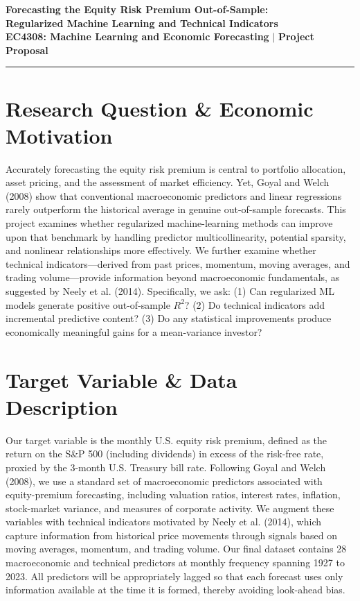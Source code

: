 \documentclass[10pt,a4paper]{article}
\begin{document}
\begin{center}
    {\Large \textbf{Forecasting the Equity Risk Premium Out-of-Sample:}}\\[2pt]
    {\large \textbf{Regularized Machine Learning and Technical Indicators}}\\[5pt]
    {\normalsize \textbf{EC4308: Machine Learning and Economic Forecasting} \quad $\vert$ \quad \textbf{Project Proposal}}
\end{center}

\vspace{-4pt}
\noindent\rule{\textwidth}{0.6pt}
\vspace{-2pt}

\section{Research Question \& Economic Motivation}
Accurately forecasting the equity risk premium is central to portfolio allocation, asset pricing, and the assessment of market efficiency. Yet, Goyal and Welch (2008) show that conventional macroeconomic predictors and linear regressions rarely outperform the historical average in genuine out-of-sample forecasts. This project examines whether regularized machine-learning methods can improve upon that benchmark by handling predictor multicollinearity, potential sparsity, and nonlinear relationships more effectively. We further examine whether technical indicators---derived from past prices, momentum, moving averages, and trading volume---provide information beyond macroeconomic fundamentals, as suggested by Neely et al. (2014). Specifically, we ask: (1) Can regularized ML models generate positive out-of-sample $R^2$? (2) Do technical indicators add incremental predictive content? (3) Do any statistical improvements produce economically meaningful gains for a mean-variance investor?

\section{Target Variable \& Data Description}
Our target variable is the monthly U.S. equity risk premium, defined as the return on the S\&P 500 (including dividends) in excess of the risk-free rate, proxied by the 3-month U.S. Treasury bill rate. Following Goyal and Welch (2008), we use a standard set of macroeconomic predictors associated with equity-premium forecasting, including valuation ratios, interest rates, inflation, stock-market variance, and measures of corporate activity. We augment these variables with technical indicators motivated by Neely et al. (2014), which capture information from historical price movements through signals based on moving averages, momentum, and trading volume. Our final dataset contains 28 macroeconomic and technical predictors at monthly frequency spanning 1927 to 2023. All predictors will be appropriately lagged so that each forecast uses only information available at the time it is formed, thereby avoiding look-ahead bias.
\end{document}
